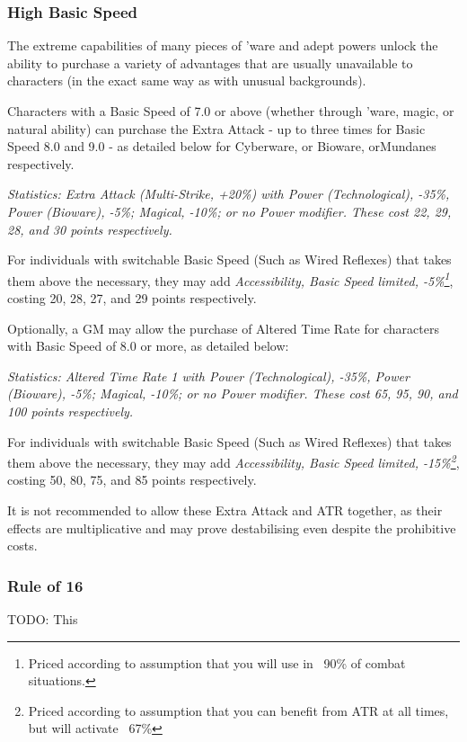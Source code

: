 \begin{multicols*}{3}
	\subsubsection{High Basic Speed}\label{high_basic_speed}
	
	The extreme capabilities of many pieces of 'ware and adept powers unlock the ability to purchase a variety of advantages that are usually unavailable to characters (in the exact same way as with unusual backgrounds).
	
	Characters with a Basic Speed of 7.0 or above (whether through 'ware, magic, or natural ability) can purchase the Extra Attack - up to three times for Basic Speed 8.0 and 9.0 - as detailed below for Cyberware, or Bioware, orMundanes respectively.
	
	\textit{\textcolor{OliveGreen}{Statistics: Extra Attack (Multi-Strike, +20\%) with Power (Technological), -35\%, Power (Bioware), -5\%; Magical, -10\%; or no Power modifier. These cost 22, 29, 28, and 30 points respectively.}}
	
	For individuals with switchable Basic Speed (Such as Wired Reflexes) that takes them above the necessary, they may add \textit{Accessibility, Basic Speed limited, -5\%\footnote{Priced according to assumption that you will use in ~90\% of combat situations.}}, costing 20, 28, 27, and 29 points respectively.
	
	Optionally, a GM may allow the purchase of Altered Time Rate for characters with Basic Speed of 8.0 or more, as detailed below:
	
	\textit{\textcolor{OliveGreen}{Statistics: Altered Time Rate 1 with Power (Technological), -35\%, Power (Bioware), -5\%; Magical, -10\%; or no Power modifier. These cost 65, 95, 90, and 100 points respectively.}}
	
	For individuals with switchable Basic Speed (Such as Wired Reflexes) that takes them above the necessary, they may add \textit{Accessibility, Basic Speed limited, -15\%\footnote{Priced according to assumption that you can benefit from ATR at all times, but will activate ~67\%}}, costing 50, 80, 75, and 85 points respectively. 
	
	It is not recommended to allow these Extra Attack and ATR together, as their effects are multiplicative and may prove destabilising even despite the prohibitive costs.
	
	\subsubsection{Rule of 16}
	
	TODO: This
	
\end{multicols*}